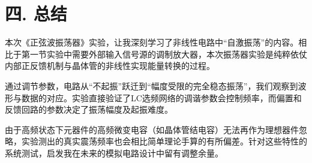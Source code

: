 \documentclass[12pt]{article}
\begin{document}
\section*{四. 总结}


本次《正弦波振荡器》实验，让我深刻学习了非线性电路中“自激振荡”的内容。相比于第一节实验中需要外部输入信号源的调制放大器，本次振荡器实验是纯粹依仗内部正反馈机制与晶体管的非线性实现能量转换的过程。

通过调节参数，电路从“不起振”跃迁到“幅度受限的完全稳态振荡”，我们观察到波形与数据的对应。实验直接验证了LC选频网络的调谐参数会控制频率，而偏置和反馈回路的参数决定了振荡幅度及起振难度。

由于高频状态下元器件的高频微变电容（如晶体管结电容）无法再作为理想器件忽略，实验测出的真实震荡频率也会相比简单理论手算的有所偏差。针对这些特性的系统测试，启发我在未来的模拟电路设计中留有调整余量。
\end{document}
